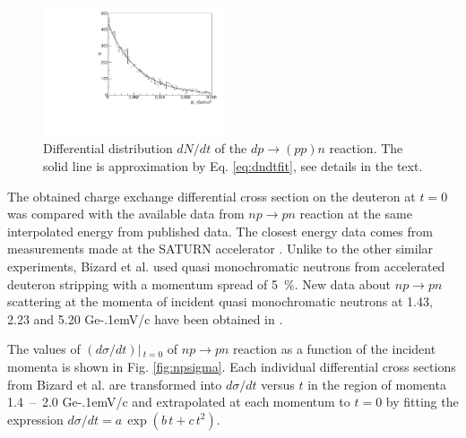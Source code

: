 \documentclass[twocolumn,epjc3]{svjour3}
\newcommand{\np}     {\ensuremath{np \rightarrow pn}\xspace}
\newcommand{\dpchex} {\ensuremath{dp \rightarrow (pp)n}\xspace}
\newcommand{\GeVc}   {Ge\kern-.1emV/c\xspace}
\begin{document}
\begin{figure}[h]
  \centering
  \includegraphics[width=0.48\textwidth]{dp_dN.pdf}
  \caption{Differential distribution $dN/dt$ of the \dpchex reaction. The solid
    line is approximation by Eq. \eqref{eq:dndtfit}, see details in the text.}
  \label{fig:dndt}
\end{figure}


The obtained charge exchange differential cross section on the deuteron at $t=0$
was compared with the available data from \np reaction at the same interpolated
energy from published data. The closest energy data comes from measurements made
at the SATURN accelerator \cite{biz75,bys78}. Unlike to the other similar
experiments, Bizard et al. \cite{biz75} used quasi monochromatic neutrons from
accelerated deuteron stripping with a momentum spread of 5~\%. New data about
\np scattering at the momenta of incident quasi monochromatic neutrons at 1.43,
2.23 and 5.20 \GeVc have been obtained in \cite{tro14}.

The values of $(d\sigma/dt)|\,_{t=0}$ of \np reaction as a function of the
incident momenta is shown in Fig. \ref{fig:npsigma}. Each individual
differential cross sections from Bizard et al. \cite{biz75} are transformed into
$d\sigma/dt$ versus $t$ in the region of momenta 1.4~--~2.0 \GeVc and
extrapolated at each momentum to $t=0$ by fitting the expression
$d\sigma/dt = a\,\exp(b\,t + c\,t^2)$.
\end{document}
